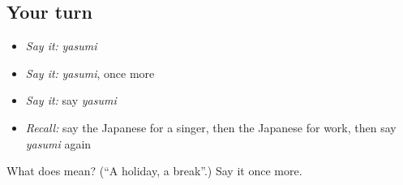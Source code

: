 \subsection*{Your turn}
\begin{itemize}
\raggedright
  \item \emph{Say it:} \emph{yasumi}
  \item \emph{Say it:} \emph{yasumi}, once more
  \item \emph{Say it:} say \emph{yasumi}
  \item \emph{Recall:} say the Japanese for a singer, then the Japanese for work, then say \emph{yasumi} again
\end{itemize}

\begin{tcolorbox}[breakable,colback=teal!4,colframe=teal!35!black,title={Before you move on}]
What does  mean? (\textquotedblleft{}A holiday, a break\textquotedblright{}.) Say it once more.
\end{tcolorbox}
